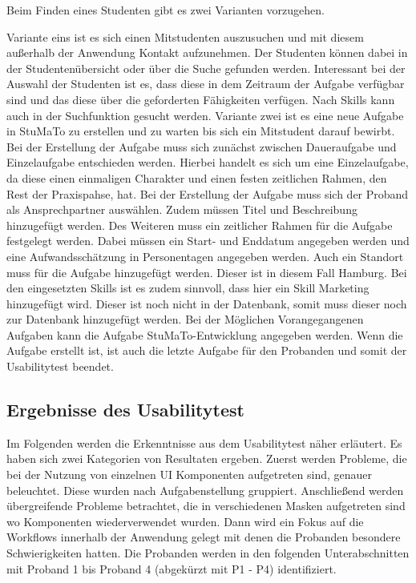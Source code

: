 \documentclass[
  12pt,
  ngerman,
  a4paper,
]{article}
\begin{document}
Beim Finden eines Studenten gibt es zwei Varianten vorzugehen.

Variante eins ist es sich einen Mitstudenten auszusuchen und mit diesem
außerhalb der Anwendung Kontakt aufzunehmen. Der Studenten können dabei
in der Studentenübersicht oder über die Suche gefunden werden.
Interessant bei der Auswahl der Studenten ist es, dass diese in dem
Zeitraum der Aufgabe verfügbar sind und das diese über die geforderten
Fähigkeiten verfügen. Nach Skills kann auch in der Suchfunktion gesucht
werden. Variante zwei ist es eine neue Aufgabe in StuMaTo zu erstellen
und zu warten bis sich ein Mitstudent darauf bewirbt. Bei der Erstellung
der Aufgabe muss sich zunächst zwischen Daueraufgabe und Einzelaufgabe
entschieden werden. Hierbei handelt es sich um eine Einzelaufgabe, da
diese einen einmaligen Charakter und einen festen zeitlichen Rahmen, den
Rest der Praxispahse, hat. Bei der Erstellung der Aufgabe muss sich der
Proband als Ansprechpartner auswählen. Zudem müssen Titel und
Beschreibung hinzugefügt werden. Des Weiteren muss ein zeitlicher Rahmen
für die Aufgabe festgelegt werden. Dabei müssen ein Start- und Enddatum
angegeben werden und eine Aufwandsschätzung in Personentagen angegeben
werden. Auch ein Standort muss für die Aufgabe hinzugefügt werden.
Dieser ist in diesem Fall Hamburg. Bei den eingesetzten Skills ist es
zudem sinnvoll, dass hier ein Skill Marketing hinzugefügt wird. Dieser
ist noch nicht in der Datenbank, somit muss dieser noch zur Datenbank
hinzugefügt werden. Bei der Möglichen Vorangegangenen Aufgaben kann die
Aufgabe StuMaTo-Entwicklung angegeben werden. Wenn die Aufgabe erstellt
ist, ist auch die letzte Aufgabe für den Probanden und somit der
Usabilitytest beendet.

\hypertarget{ergebnisse-des-usabilitytest}{%
\subsection{Ergebnisse des
Usabilitytest}\label{ergebnisse-des-usabilitytest}}

Im Folgenden werden die Erkenntnisse aus dem Usabilitytest näher
erläutert. Es haben sich zwei Kategorien von Resultaten ergeben. Zuerst
werden Probleme, die bei der Nutzung von einzelnen UI Komponenten
aufgetreten sind, genauer beleuchtet. Diese wurden nach Aufgabenstellung
gruppiert. Anschließend werden übergreifende Probleme betrachtet, die in
verschiedenen Masken aufgetreten sind wo Komponenten wiederverwendet
wurden. Dann wird ein Fokus auf die Workflows innerhalb der Anwendung
gelegt mit denen die Probanden besondere Schwierigkeiten hatten. Die
Probanden werden in den folgenden Unterabschnitten mit Proband 1 bis
Proband 4 (abgekürzt mit P1 - P4) identifiziert.
\end{document}
